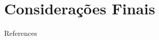 \documentclass[10pt]{beamer}
\begin{document}
\section{Considerações Finais}


\appendix


\begin{frame}[allowframebreaks]{References}

  
  

\end{frame}
\end{document}
